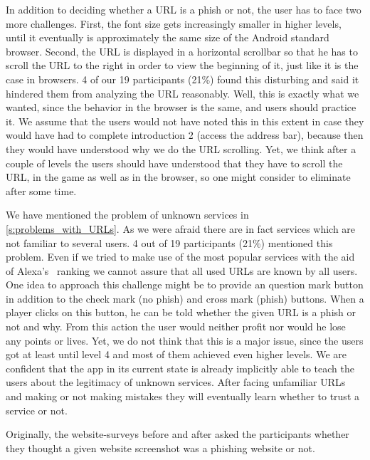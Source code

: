 \begin{description}[leftmargin=0cm]	
	\item[Scrolling of URL] In addition to deciding whether a URL is a phish or not, the user has to face two more 	challenges. 
First, the font size gets increasingly smaller in higher levels, until it eventually is approximately the same size of the Android standard browser.
Second, the URL is displayed in a horizontal scrollbar so that he has to scroll the URL to the right in order to view the beginning of it, just like it is the case in browsers.
4 of our 19 participants (21\%) found this disturbing and said it hindered them from analyzing the URL reasonably. 
Well, this is exactly what we wanted, since the behavior in the browser is the same, and users should practice it.
We assume that the users would not have noted this in this extent in case they would have had to complete introduction 2 (access the address bar), because then they would have understood why we do the URL scrolling.
Yet, we think after a couple of levels the users should have understood that they have to scroll the URL, in the game as well as in the browser, so one might consider to eliminate after some time. 
	\item[Unknown Services] We have mentioned the problem of unknown services in \autoref{s:problems_with_URLs}.
As we were afraid there are in fact services which are not familiar to several users.
4 out of 19 participants (21\%) mentioned this problem.
Even if we tried to make use of the most popular services with the aid of Alexa's~\cite{alexa} ranking we cannot assure that all used URLs are known by all users.
One idea to approach this challenge might be to provide an question mark button in addition to the check mark (no phish) and cross mark (phish) buttons. 
When a player clicks on this button, he can be told whether the given URL is a phish or not and why.
From this action the user would neither profit nor would he lose any points or lives.
Yet, we do not think that this is a major issue, since the users got at least until level 4 and most of them achieved even higher levels.
We are confident that the app in its current state is already implicitly able to teach the users about the legitimacy of unknown services.
After facing unfamiliar URLs and making or not making mistakes they will eventually learn whether to trust a service or not.
	\item[Question to Data Entry] Originally, the website-surveys before and after asked the participants whether they thought a given website screenshot was a phishing website or not.

\end{description}

